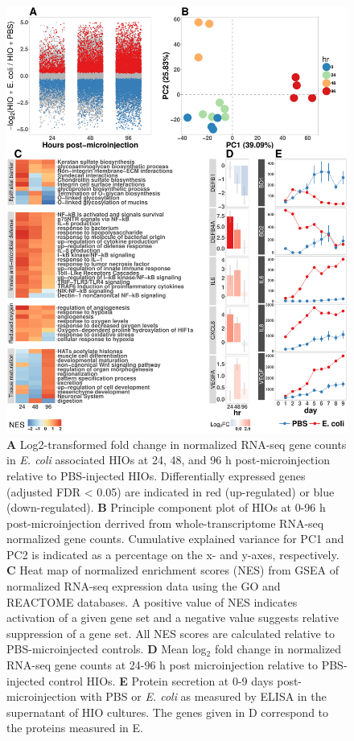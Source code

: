 \documentclass[9pt,lineo]{elife}
\begin{document}
\begin{figure}
\begin{fullwidth}
\centering
\includegraphics[width=0.85\linewidth]{./figures/figure2/figure2_multipanel.pdf}
\caption{\textbf{A} Log2-transformed fold change in normalized RNA-seq gene counts in \textit{E. coli} associated HIOs at 24, 48, and 96 h post-microinjection relative to PBS-injected HIOs. Differentially expressed genes (adjusted FDR < 0.05) are indicated in red (up-regulated) or blue (down-regulated). \textbf{B} Principle component plot of HIOs at 0-96 h post-microinjection derrived from whole-transcriptome RNA-seq normalized gene counts. Cumulative explained variance for PC1 and PC2 is indicated as a percentage on the x- and y-axes, respectively. \textbf{C} Heat map of normalized enrichment scores (NES) from GSEA of normalized RNA-seq expression data using the GO and REACTOME databases. A positive value of NES indicates activation of a given gene set and a negative value suggests relative suppression of a gene set. All NES scores are calculated relative to PBS-microinjected controls. \textbf{D} Mean log$_{2}$ fold change in normalized RNA-seq gene counts at 24-96 h post microinjection relative to PBS-injected control HIOs. \textbf{E} Protein secretion at 0-9 days post-microinjection with PBS or \textit{E. coli} as measured by ELISA in the supernatant of HIO cultures. The genes given in D correspond to the proteins measured in E.}
\label{fig:fullwidth}
\end{fullwidth}
\end{figure}
\end{document}
